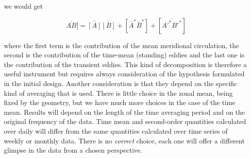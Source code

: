 we would get

\begin{equation}
    \overline{AB}] = \bar{[A]}\bar{[B]} +  [\bar{A}^*\bar{B}^*]+[\overline{A'^*B'^*}]
\end{equation}


where the first term is the contribution of the mean meridional
circulation, the second is the contribution of the time-mean
(standing) eddies and the last one is the contribution of the
transient eddies. This kind of decomposition is therefore a useful instrument but
requires always consideration of the hypothesis formulated in the
initial design. Another consideration is that they depend on the
specific kind of averaging that is used. There is little choice in the
zonal mean, being fixed by the geometry, but we have much more choices
in the case of the time mean. Results will depend on the length of the
time averaging period and on the original frequency of the data. Time
mean and second-order quantities calculated over daily will differ from
the same quantities calculated over time series of weekly or monthly
data. There is no \emph{correct} choice, each one will offer a different
glimpse in the data from a chosen perspective.





